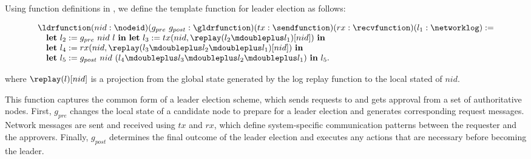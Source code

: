 Using function definitions in , we define the template function for leader election as follows:
\begin{small}
$$
\begin{array}{l}
	\ldrfunction (nid: \nodeid) (g_{pre}\ g_{post}:  \gldrfunction)
	(tx: \sendfunction)(rx: \recvfunction)(l_1  :\networklog ) := \\
\ \ \ \mbox{\textbf{let}} \ l_2 := g_{pre}\ nid \ l  \ \mbox{\textbf{in}}\ \mbox{\textbf{let}}\ l_3 := tx(nid, \replay(l_2 \mdoubleplus l_1)[nid]) \ \mbox{\textbf{in}}  \\
\ \ \ \mbox{\textbf{let}} \ l_4 := rx(nid, \replay(l_3 \mdoubleplus l_2 \mdoubleplus l_1)[nid]) \
  \mbox{\textbf{in}}\\ 
\ \ \  \mbox{\textbf{let}} \ l_5 := g_{post}\ nid \ (l_4 \mdoubleplus l_3 \mdoubleplus l_2 \mdoubleplus l_1) \ \mbox{\textbf{in}} \ l_5. \\
\end{array}
$$
\end{small}
where $\replay(l)[nid]$ is a projection from the global state generated by the log replay function to 
the local stated of $nid$.


This function captures the common form of a leader election scheme, which sends requests to
and gets approval from a set of authoritative nodes.
First, $g_{pre}$ changes the local state of a candidate node to prepare
for a leader election and generates corresponding request messages.
Network messages are sent and received using $tx$ and $rx$, which define system-specific
communication patterns between the requester and the approvers.
Finally, $g_{post}$ determines the final outcome of the
leader election and executes any actions that are necessary before becoming the leader.

